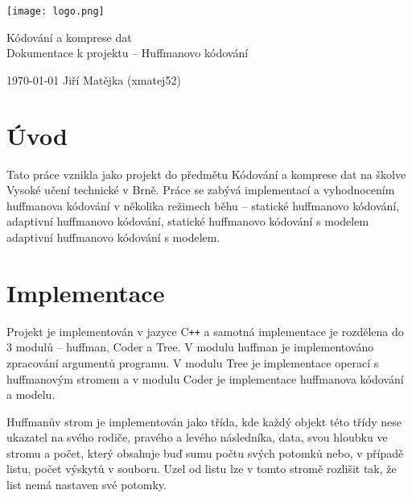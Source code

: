 \documentclass[11pt,a4paper,titlepage]{article}
\begin{document}
		\begin{center}

			\texttt{[image: logo.png]}\\


			\LARGE
			Kódování a komprese dat\\
			Dokumentace k projektu -- Huffmanovo kódování\\

		\end{center}

	\Large{\today} \hfill Jiří Matějka (xmatej52)
	\thispagestyle{empty}
	\newpage
	\setcounter{page}{1}

    \tableofcontents
	\newpage
	\newpage

    \section{Úvod}
        Tato práce vznikla jako projekt do předmětu Kódování a komprese dat na školve Vysoké učení technické v Brně.
        Práce se zabývá implementací a vyhodnocením huffmanova kódování v několika režimech běhu -- statické huffmanovo kódování,
        adaptivní huffmanovo kódování, statické huffmanovo kódování s modelem adaptivní huffmanovo kódování s modelem.

    \section{Implementace}
        Projekt je implementován v jazyce C\texttt{++} a samotná implementace je rozdělena do 3 modulů -- huffman, Coder a Tree.
        V modulu huffman je implementováno zpracování argumentů programu. V modulu Tree je implementace operací s huffmanovým stromem
        a v modulu Coder je implementace huffmanova kódování a modelu.

        Huffmanův strom je implementován jako třída, kde každý objekt této třídy nese ukazatel na svého rodiče, pravého a levého následníka,
        data, svou hloubku ve stromu a počet, který obsahuje buď sumu počtu svých potomků nebo, v případě listu, počet výskytů v souboru.
        Uzel od listu lze v tomto stromě rozlišit tak, že list nemá nastaven své potomky.
\end{document}
